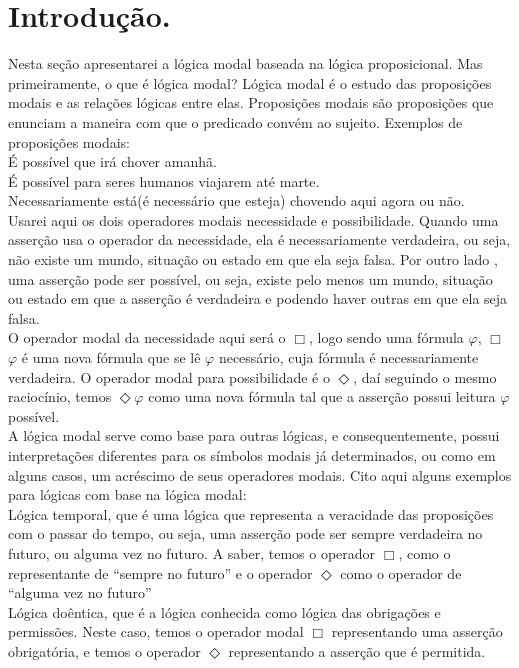 \section{Introdução.}
     \hspace{0.5cm} Nesta seção apresentarei a lógica modal baseada na lógica proposicional. Mas primeiramente, o que é lógica modal? Lógica modal é o estudo das proposições modais e as relações lógicas entre elas. Proposições modais são proposições que enunciam a maneira com que o predicado convém ao sujeito. Exemplos de proposições modais:\\
	\indent É possível que irá chover amanhã.\\
	\indent É possível para seres humanos viajarem até marte.\\
	\indent Necessariamente está(é necessário que esteja) chovendo aqui agora ou não.\\
       \indent Usarei aqui os dois operadores modais necessidade e possibilidade. Quando uma asserção usa o operador da necessidade, ela é necessariamente verdadeira, ou seja, não existe um mundo, situação ou estado em que ela seja falsa. Por outro lado , uma asserção pode ser possível, ou seja, existe pelo menos um mundo,  situação ou estado em que a asserção é verdadeira e podendo haver outras em que ela seja falsa. \\
       \indent  O operador modal da necessidade aqui será o $\Box$, logo sendo uma fórmula $\varphi$, $\Box$$\varphi$ é uma nova fórmula que se lê $\varphi$ necessário, cuja fórmula é necessariamente verdadeira. O operador modal para possibilidade é o $\Diamond$, daí seguindo o mesmo raciocínio, temos $\Diamond$$\varphi$ como uma nova fórmula tal que a asserção possui leitura $\varphi$ possível.\\
     \indent A lógica modal serve como base para outras lógicas, e consequentemente, possui interpretações diferentes para os símbolos modais já determinados,  ou como em alguns casos, um acréscimo de seus operadores modais. Cito aqui alguns exemplos para lógicas com base na lógica modal:\\
         \indent Lógica temporal, que é uma lógica que representa a veracidade das proposições com o passar do tempo, ou seja, uma asserção pode ser sempre verdadeira no futuro, ou alguma vez no futuro. A saber, temos o operador $\Box$, como o representante de “sempre no futuro” e o operador $\Diamond$ como o operador de “alguma vez no futuro” \\
       \indent Lógica doêntica, que é a lógica conhecida como lógica das obrigações e permissões. Neste caso, temos o operador modal $\Box$ representando uma asserção obrigatória, e temos o operador $\Diamond$ representando a asserção que é permitida.\\
